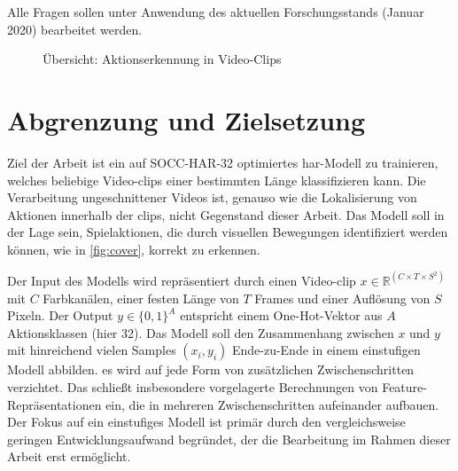 Alle Fragen sollen unter Anwendung des aktuellen Forschungsstands (Januar 2020) bearbeitet werden.

\begin{figure}[htbp]
    \centering


    \caption{Übersicht: Aktionserkennung in Video-Clips }
    \label{fig:cover}
\end{figure}

\section{Abgrenzung und Zielsetzung}
\label{sec:zielsetzung}

Ziel der Arbeit ist ein auf SOCC-HAR-32 optimiertes \gls{har}-Modell zu trainieren, welches beliebige Video-\glspl{clip} einer bestimmten Länge klassifizieren kann.
Die Verarbeitung ungeschnittener Videos ist, genauso wie die Lokalisierung von Aktionen innerhalb der \glspl{clip}, nicht Gegenstand dieser Arbeit.
Das Modell soll in der Lage sein, Spielaktionen, die durch visuellen Bewegungen identifiziert werden können, wie in \autoref{fig:cover}, korrekt zu erkennen.

Der Input des Modells wird repräsentiert durch einen Video-\gls{clip} $x \in \mathbb{R}^{(C \times T \times S^2)}$ mit $C$ Farbkanälen, einer festen Länge von $T$ Frames und einer Auflösung von $S$ Pixeln.
Der Output $y \in \{0, 1\}^A$ entspricht einem One-Hot-Vektor aus $A$ Aktionsklassen (hier 32).
Das Modell soll den Zusammenhang zwischen $x$ und $y$ mit hinreichend vielen Samples $(x_i, y_i)$ Ende-zu-Ende in einem einstufigen Modell abbilden.
\Dh es wird auf jede Form von zusätzlichen Zwischenschritten verzichtet.
Das schließt insbesondere vorgelagerte Berechnungen von Feature-Repräsentationen ein, die in mehreren Zwischenschritten aufeinander aufbauen.
Der Fokus auf ein einstufiges Modell ist primär durch den vergleichsweise geringen Entwicklungsaufwand begründet, der die Bearbeitung im Rahmen dieser Arbeit erst ermöglicht.

